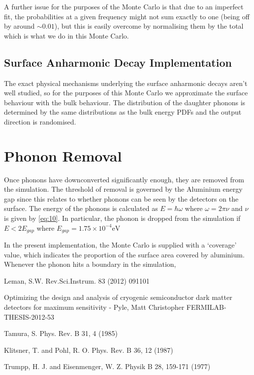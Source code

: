 \documentclass[11pt]{article}
\newcommand{\e}[1]{\times 10^{#1}}
\begin{document}
A further issue for the purposes of the Monte Carlo is that due to an imperfect fit, the probabilities at a given frequency might not sum exactly
to one (being off by around $\sim 0.01$), but this is easily overcome by normalising them by the total which is what we do in this Monte Carlo.

\subsection*{Surface Anharmonic Decay Implementation}
The exact physical mechanisms underlying the surface anharmonic decays aren't well studied, so for the purposes of this Monte Carlo we approximate
the surface behaviour with the bulk behaviour. The distribution of the daughter phonons is determined by the same distributions as the bulk 
energy PDFs and the output direction is randomised.

\section*{Phonon Removal}
Once phonons have downconverted significantly enough, they are removed from the simulation. The threshold of removal is governed by the Aluminium 
energy gap since this relates to whether phonons can be seen by the detectors on the surface. The energy of the phonons is calculated as 
$E = \hbar \omega$ where $\omega = 2\pi \nu$ and $\nu$ is given by \eqref{eq:10}. In particular, the phonon is dropped from the simulation if 
$E < 2E_{gap}$ where $E_{gap} = 1.75\e{-4} \si{\electronvolt}$

In the present implementation, the Monte Carlo is supplied with a `coverage' value, which indicates the proportion of the surface area covered
by aluminium. Whenever the phonon hits a boundary in the simulation, 

\pagebreak
\begin{thebibliography}{99} 
Leman, S.W. Rev.Sci.Instrum. 83 (2012) 091101 

Optimizing the design and analysis of cryogenic semiconductor dark matter detectors for maximum sensitivity - Pyle, Matt Christopher FERMILAB-THESIS-2012-53

Tamura, S. Phys. Rev. B 31, 4 (1985)

Klitsner, T. and Pohl, R. O. Phys. Rev. B 36, 12 (1987)

Trumpp, H. J. and Eisenmenger, W. Z. Physik B 28, 159-171 (1977)
\end{thebibliography}
\end{document}
